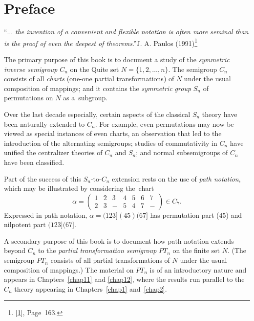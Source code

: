 \documentclass{surv-l}
\numberwithin{equation}{section}
\numberwithin{table}{section}
\numberwithin{figure}{section}
\theoremstyle{definition}
\begin{document}
\mainmatter

\chapter*{Preface}


\noindent ``$\ldots$ \emph{the invention of a convenient and flexible
notation is often more seminal than is the proof
of even the deepest of theorems}.''\hfill J. A. Paulos
(1991)\footnote{[\hyperlink{bib1}{1}], Page~163.}

The primary purpose of this book is to document a study of the
\emph{symmetric inverse
semigroup} $C_{n}$ on the Quite set
$N=\{1,2,\ldots,n\}$. The semigroup $C_{n}$ consists of all
\emph{charts} (one-one partial transformations) of $N$ under the usual composition of
mappings; and it contains the \emph{symmetric group} $S_{n}$ of
permutations on $N$ as a~subgroup.

Over the last decade especially, certain aspects of the classical
$S_{n}$ theory have been naturally extended to $C_{n}$. For
example, even permutations may now be viewed as special instances
of even charts, an observation that led to the introduction of the
alternating semigroups; studies of commutativity in $C_{n}$ have
unified the centralizer theories of $C_{n}$ and $S_{n}$; and
normal subsemigroups of $C_{n}$ have been classified.

Part of the success of this $S_{n}$-to-$C_{n}$ extension rests on
the use of \emph{path notation}, which may be
illustrated by considering the~chart
\[
\alpha=\left(\begin{matrix}
1 & 2 & 3 & 4 & 5 & 6 & 7\\
2 & 3 & - & 5 & 4 & 7 & -
\end{matrix}\right)\in C_{7}.
\]
Expressed in path notation, $\alpha=(123](45)(67]$ has permutation
part (45) and nilpotent part $(123](67]$.

A secondary purpose of this book is to document how path notation
extends beyond $C_{n}$ to the \emph{partial transformation
semigroup} $PT_{n}$ on the finite
set $N$. (The semigroup $PT_{n}$ consists of all partial
transformations of $N$ under the usual composition of mappings.)
The material on $PT_{n}$ is of an introductory nature and appears
in Chapters~\ref{chap11} and \ref{chap12}, where the results run
parallel to the $C_{n}$ theory appearing in Chapters~\ref{chap1}
and~\ref{chap2}.
\end{document}
